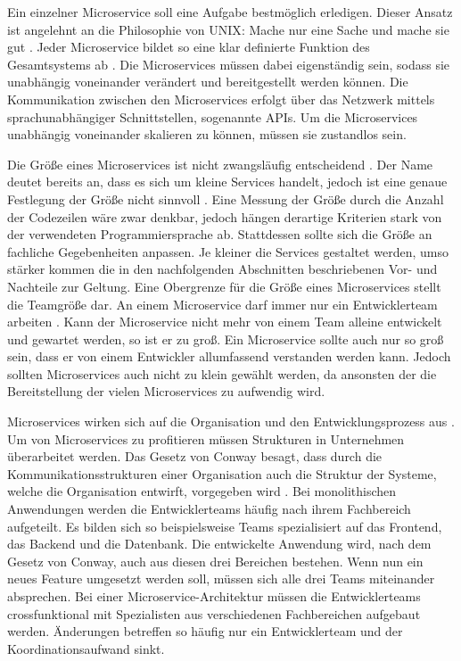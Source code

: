 Ein einzelner Microservice soll eine Aufgabe bestmöglich erledigen. Dieser Ansatz ist angelehnt an die Philosophie von \ac{UNIX}: \glqq Mache nur eine Sache und mache sie gut\grqq{} \parencite[vgl.][]{salusQuarter1994}. Jeder Microservice bildet so eine klar definierte Funktion des Gesamtsystems ab \parencite[vgl.][S. 64]{trempArchitekturen2021}. Die Microservices müssen dabei eigenständig sein, sodass sie unabhängig voneinander verändert und bereitgestellt werden können. Die Kommunikation zwischen den Microservices erfolgt über das Netzwerk mittels sprachunabhängiger Schnittstellen, sogenannte \acp{API}. Um die Microservices unabhängig voneinander skalieren zu können, müssen sie zustandlos sein.

Die Größe eines Microservices ist nicht zwangsläufig entscheidend \parencite[vgl.][S. 2]{wolffMicroservices2018}. Der Name deutet bereits an, dass es sich um kleine Services handelt, jedoch ist eine genaue Festlegung der Größe nicht sinnvoll \parencite[vgl.][S. 22]{newmanMicroservices2015}. Eine Messung der Größe durch die Anzahl der Codezeilen wäre zwar denkbar, jedoch hängen derartige Kriterien stark von der verwendeten Programmiersprache ab. Stattdessen sollte sich die Größe an fachliche Gegebenheiten anpassen. Je kleiner die Services gestaltet werden, umso stärker kommen die in den nachfolgenden Abschnitten beschriebenen Vor- und Nachteile zur Geltung. Eine Obergrenze für die Größe eines Microservices stellt die Teamgröße dar. An einem Microservice darf immer nur ein Entwicklerteam arbeiten \parencite[vgl.][S. 23]{newmanMicroservices2015}. Kann der Microservice nicht mehr von einem Team alleine entwickelt und gewartet werden, so ist er zu groß. Ein Microservice sollte auch nur so groß sein, dass er von einem Entwickler allumfassend verstanden werden kann. Jedoch sollten Microservices auch nicht zu klein gewählt werden, da ansonsten der die Bereitstellung der vielen Microservices zu aufwendig wird.

Microservices wirken sich auf die Organisation und den Entwicklungsprozess aus \parencite[vgl.][S. 2]{wolffMicroservices2018}. Um von Microservices zu profitieren müssen Strukturen in Unternehmen überarbeitet werden. Das Gesetz von Conway besagt, dass durch die Kommunikationsstrukturen einer Organisation auch die Struktur der Systeme, welche die Organisation entwirft, vorgegeben wird \parencite[vgl.]{conwayHow1968}. Bei monolithischen Anwendungen werden die Entwicklerteams häufig nach ihrem Fachbereich aufgeteilt. Es bilden sich so beispielsweise Teams spezialisiert auf das Frontend, das Backend und die Datenbank. Die entwickelte Anwendung wird, nach dem Gesetz von Conway, auch aus diesen drei Bereichen bestehen. Wenn nun ein neues Feature umgesetzt werden soll, müssen sich alle drei Teams miteinander absprechen. Bei einer Microservice-Architektur müssen die Entwicklerteams crossfunktional mit Spezialisten aus verschiedenen Fachbereichen aufgebaut werden. Änderungen betreffen so häufig nur ein Entwicklerteam und der Koordinationsaufwand sinkt.

